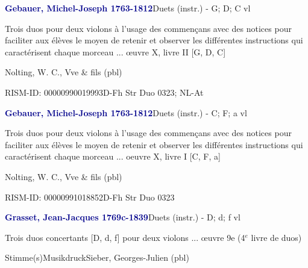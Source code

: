 \documentclass[twocolumn, 12pt]{book}
\begin{document}
\par \vspace{16pt} \textcolor{darkblue}{\textbf{Gebauer, Michel-Joseph  1763-1812}}\hfillplus{\textbf{[277]}}\newline Duets (instr.) - G; D; C vl
\par \begin{itshape}Trois duos pour deux violons à l'usage des commençans avec des notices pour faciliter aux élèves le moyen de retenir et observer les différentes instructions qui caractérisent chaque morceau ... œuvre X, livre II [G, D, C]\end{itshape} \newline Nolting, W. C., Vve \& fils  (pbl)
\par RISM-ID: 00000990019993\newline D-Fh  Str Duo 0323; NL-At
\par \vspace{16pt} \textcolor{darkblue}{\textbf{Gebauer, Michel-Joseph  1763-1812}}\hfillplus{\textbf{[278]}}\newline Duets (instr.) - C; F; a vl
\par \begin{itshape}Trois duos pour deux violons à l'usage des commençans avec des notices pour faciliter aux élèves le moyen de retenir et observer les différentes instructions qui caractérisent chaque morceau ... oeuvre X, livre I [C, F, a]\end{itshape} \newline Nolting, W. C., Vve \& fils  (pbl)
\par RISM-ID: 00000991018852\newline D-Fh  Str Duo 0323
\par \vspace{16pt} \textcolor{darkblue}{\textbf{Grasset, Jean-Jacques  1769c-1839}}\hfillplus{\textbf{[279]}}\newline Duets (instr.) - D; d; f vl
\par \begin{itshape}Trois duos concertants [D, d, f] pour deux violons ... œuvre 9e (4$^e$ livre de duos)\end{itshape} 
\par \textcolor{darkblue}{}  Stimme(s)\newline Musikdruck\newline Sieber, Georges-Julien  (pbl)
\end{document}
